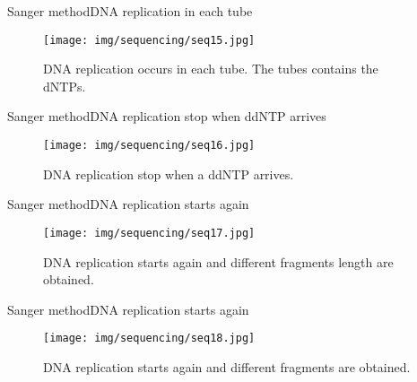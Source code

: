 \documentclass[10pt]{beamer}
\newcommand{\1}{
	\setbeamertemplate{background}{
		\texttt{[image: img/1]}
		\tikz[overlay] \fill[fill opacity=0.75,fill=white] (0,0) rectangle (-\paperwidth,\paperheight);
	}
}
\begin{document}
\begin{frame}{Sanger method}{DNA replication in each tube}
	\begin{figure}[]
		\centering
		\texttt{[image: img/sequencing/seq15.jpg]}
		\label{img:mot2}
		\caption{DNA replication occurs in each tube. The tubes contains the dNTPs.}
	\end{figure}
\end{frame}

\begin{frame}{Sanger method}{DNA replication stop when ddNTP arrives}
	\begin{figure}[]
		\centering
		\texttt{[image: img/sequencing/seq16.jpg]}
		\label{img:mot2}
		\caption{DNA replication stop when a ddNTP arrives.}
	\end{figure}
\end{frame}


\begin{frame}{Sanger method}{DNA replication starts again}
	\begin{figure}[]
		\centering
		\texttt{[image: img/sequencing/seq17.jpg]}
		\label{img:mot2}
		\caption{DNA replication starts again and different fragments length are obtained.}
	\end{figure}
\end{frame}


\begin{frame}{Sanger method}{DNA replication starts again}
	\begin{figure}[]
		\centering
		\texttt{[image: img/sequencing/seq18.jpg]}
		\label{img:mot2}
		\caption{DNA replication starts again and different fragments are obtained.}
	\end{figure}
\end{frame}
\end{document}
